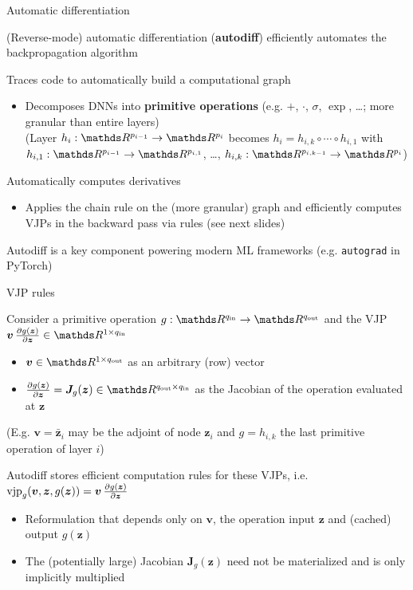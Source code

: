\documentclass[11pt,compress,t,notes=noshow, xcolor=table]{beamer}
\newcommand{\zv}{\bm{z}}                 %
\newcommand{\adj}[1]{\bar{\bm{z}}_{#1}}  %
\begin{document}
\begin{framei}{Automatic differentiation}
\item (Reverse-mode) automatic differentiation (\textbf{autodiff}) efficiently automates the backpropagation algorithm
\item Traces code to automatically build a computational graph
\begin{itemize}
  \item Decomposes DNNs into \textbf{primitive operations} (e.g. $+$, $\cdot$, $\sigma$, $\exp$, \ldots; more granular than entire layers) \\
  {\footnotesize(Layer $h_i: \R^{p_{i-1}} \to \R^{p_i}$ becomes $h_i = h_{i,k} \circ \cdots \circ h_{i,1}$ with $h_{i,1}: \R^{p_{i-1}} \to \R^{p_{i,1}}$, \ldots, $h_{i,k}: \R^{p_{i,k-1}} \to \R^{p_i}$)}
\end{itemize}
\item Automatically computes derivatives
\begin{itemize}
  \item Applies the chain rule on the (more granular) graph and efficiently computes VJPs in the backward pass via rules (see next slides) 
\end{itemize}
\item[$\Rightarrow$] Autodiff is a key component powering modern ML frameworks (e.g. \texttt{autograd} in PyTorch)
\end{framei}

\begin{framei}{VJP rules}
\item Consider a primitive operation $g: \R^{q_{\mathrm{in}}} \to \R^{q_{\mathrm{out}}}$ and the VJP $\bm{v} \, \pd{g(\zv)}{\zv} \in \R^{1 \times q_{\mathrm{in}}}$
\begin{itemize}
  \item $\bm{v} \in \R^{1 \times q_{\mathrm{out}}}$ as an arbitrary (row) vector
  \item $\pd{g(\zv)}{\zv}= \bm{J}_{g}(\zv) \in \R^{q_{\mathrm{out}} \times q_{\mathrm{in}}}$ as the Jacobian of the operation evaluated at $\zv$
\end{itemize}
{\footnotesize(E.g. $\bm{v} = \adj{i}$ may be the adjoint of node $\zv_i$ and $g = h_{i,k}$ the last primitive operation of layer $i$)}
\item Autodiff stores efficient computation rules for these VJPs, i.e. $\text{vjp}_g(\bm{v}, \zv, g(\zv))= \bm{v} \, \pd{g(\zv)}{\zv}$
\begin{itemize}
  \item Reformulation that depends only on $\bm{v}$, the operation input $\zv$ and (cached) output $g(\zv)$
  \item[$\Rightarrow$] The (potentially large) Jacobian $\bm{J}_{g}(\zv)$ need not be materialized and is only implicitly multiplied
\end{itemize}
\end{framei}
\end{document}
